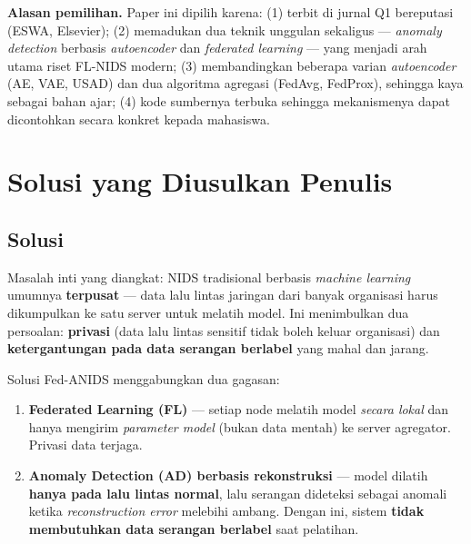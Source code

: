 \documentclass[11pt,a4paper]{article}
\begin{document}
\noindent\textbf{Alasan pemilihan.} Paper ini dipilih karena:
(1) terbit di jurnal Q1 bereputasi (ESWA, Elsevier);
(2) memadukan dua teknik unggulan sekaligus --- \emph{anomaly detection}
berbasis \emph{autoencoder} dan \emph{federated learning} --- yang menjadi
arah utama riset FL-NIDS modern;
(3) membandingkan beberapa varian \emph{autoencoder} (AE, VAE, USAD) dan dua
algoritma agregasi (FedAvg, FedProx), sehingga kaya sebagai bahan ajar;
(4) kode sumbernya terbuka sehingga mekanismenya dapat dicontohkan secara
konkret kepada mahasiswa.

\section{Solusi yang Diusulkan Penulis}

\subsection{Solusi}
Masalah inti yang diangkat: NIDS tradisional berbasis \emph{machine learning}
umumnya \textbf{terpusat} --- data lalu lintas jaringan dari banyak organisasi
harus dikumpulkan ke satu server untuk melatih model. Ini menimbulkan dua
persoalan: \textbf{privasi} (data lalu lintas sensitif tidak boleh keluar
organisasi) dan \textbf{ketergantungan pada data serangan berlabel} yang mahal
dan jarang.

Solusi Fed-ANIDS menggabungkan dua gagasan:
\begin{enumerate}[leftmargin=1.4em]
  \item \textbf{Federated Learning (FL)} --- setiap node melatih model
  \emph{secara lokal} dan hanya mengirim \emph{parameter model} (bukan data
  mentah) ke server agregator. Privasi data terjaga.
  \item \textbf{Anomaly Detection (AD) berbasis rekonstruksi} --- model dilatih
  \textbf{hanya pada lalu lintas normal}, lalu serangan dideteksi sebagai
  anomali ketika \emph{reconstruction error} melebihi ambang. Dengan ini,
  sistem \textbf{tidak membutuhkan data serangan berlabel} saat pelatihan.
\end{enumerate}
\end{document}
